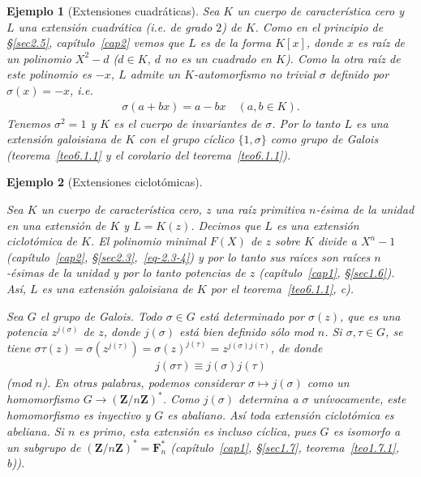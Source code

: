 \documentclass[oneside,bibtotoc,leqno,spanish]{amsbook}
\newcommand{\ZZ}{\mathbf{Z}}
\newcommand{\FF}{\mathbf{F}}
\renewcommand{\to}[1][]{\xrightarrow{#1}}
\numberwithin{equation}{section}
\theoremstyle{defi}
\theoremstyle{note}
\theoremstyle{rem}
\newtheorem{example}{Ejemplo}
\numberwithin{theorem}{section}
\numberwithin{proposition}{section}
\numberwithin{definition}{section}
\numberwithin{lemma}{section}
\numberwithin{corollary}{section}
\numberwithin{example}{section}
\numberwithin{footnote}{section}%
\begin{document}
\begin{example}[Extensiones cuadr\'aticas]

Sea $K$ un cuerpo de caracter\'istica cero y $L$ una extensi\'on cuadr\'atica (i.e. de
grado $2$) de $K$.
Como en el principio de \S\ref{sec2.5}, cap\'itulo~\ref{cap2} vemos que $L$ es de la
forma $K[x]$, donde $x$ es
ra\'iz de un polinomio $X^{2}-d$ ($d\in K$, $d$ no es un cuadrado en $K$). Como la otra
ra\'iz de este polinomio
es $-x$, $L$ admite un $K$-automorfismo no trivial $\sigma$ definido por $\sigma(x) = -x$, i.e.
\begin{gather*}
\sigma(a+bx) = a-bx\quad(a,b\in K).
\end{gather*}
Tenemos $\sigma^{2}=1$ y $K$ es el cuerpo de invariantes de $\sigma$.
Por lo tanto $L$ es una extensi\'on
{\em galoisiana} de $K$ con el grupo {\em c\'iclico} $\{1,\sigma\}$ como grupo de
Galois (teorema~\ref{teo6.1.1} y el corolario del teorema~\ref{teo6.1.1}).
\end{example}

\begin{example}[Extensiones ciclot\'omicas]\label{ej6.1.2}

Sea $K$ un cuerpo de caracter\'istica cero, $z$ una ra\'iz primitiva $n$-\'esima de
la unidad en una
extensi\'on de $K$ y $L=K(z)$. Decimos que $L$ es una extensi\'on {\em ciclot\'omica}
de $K$. El polinomio
minimal $F(X)$ de $z$ sobre $K$ divide a $X^{n}-1$
(cap\'itulo~\ref{cap2}, \S\ref{sec2.3},~\eqref{eq-2.3-4}) y por lo tanto
sus ra\'ices son ra\'ices $n$-\'esimas de la unidad y por lo tanto potencias
de $z$ (cap\'itulo~\ref{cap1}, \S\ref{sec1.6}).
As\'i, $L$ es una extensi\'on {\em galoisiana} de $K$ por el
teorema~\ref{teo6.1.1}, {\itshape c}).

Sea $G$ el grupo de Galois. Todo $\sigma\in G$ est\'a determinado por $\sigma(z)$,
que es una potencia
$z^{j(\sigma)}$ de $z$, donde $j(\sigma)$ est\'a bien definido s\'olo mod $n$.
Si $\sigma,\tau\in G$, se tiene
$\sigma\tau(z) = \sigma(z^{j(\tau)}) = \sigma(z)^{j(\tau)} = z^{j(\sigma)j(\tau)}$, de donde
\begin{gather*}
j(\sigma\tau) \equiv j(\sigma)j(\tau)
\end{gather*}
(mod $n$). En otras palabras, podemos considerar $\sigma\mapsto j(\sigma)$ como
un {\em homomorfismo}
$G\to(\ZZ/n\ZZ)^{*}$. Como $j(\sigma)$ determina a $\sigma$ un\'ivocamente, este
homomorfismo es {\em inyectivo}
y $G$ es abaliano. As\'i {\em toda extensi\'on ciclot\'omica es abeliana.} Si $n$ es
primo, esta extensi\'on
es incluso {\em c\'iclica,} pues $G$ es isomorfo a un subgrupo de
$(\ZZ/n\ZZ)^{*} = \FF_{n}^{*}$ (cap\'itulo~\ref{cap1},
\S\ref{sec1.7}, teorema~\ref{teo1.7.1}, {\itshape b})).
\end{example}
\end{document}
